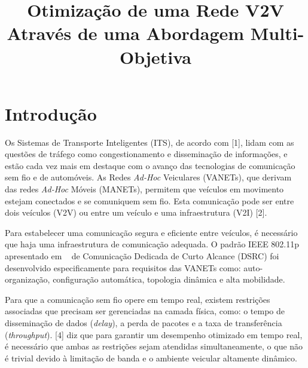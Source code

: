 \documentclass[conference]{IEEEtran}
\begin{document}
\title{Otimização de uma Rede V2V Através de uma Abordagem Multi-Objetiva}

\author{
\and
{}
}

\maketitle

\begin{abstract}
\end{abstract}

\section{Introdução}

Os Sistemas de Transporte Inteligentes (ITS), de acordo com [1], lidam com as questões de tráfego como congestionamento e disseminação de informações, e estão cada vez mais em destaque com o avanço das tecnologias de comunicação sem fio e de automóveis. As Redes \textit{Ad-Hoc} Veiculares (VANETs), que derivam das redes \textit{Ad-Hoc} Móveis (MANETs), permitem que veículos em movimento estejam conectados e se comuniquem sem fio. Esta comunicação pode ser entre dois veículos (V2V) ou entre um veículo e uma infraestrutura (V2I) [2].

Para estabelecer uma comunicação segura e eficiente entre veículos, é
necessário que haja uma infraestrutura de comunicação adequada. O
padrão IEEE 802.11p apresentado em ~\cite{jiang-delgrossi-2008}
 de Comunicação Dedicada de
Curto Alcance (DSRC) foi desenvolvido especificamente para requisitos
das VANETs como: auto-organização, configuração automática, topologia
dinâmica e alta mobilidade.

Para que a comunicação sem fio opere em tempo real, existem restrições associadas que precisam ser gerenciadas na camada física, como: o tempo de disseminação de dados (\textit{delay}), a perda de pacotes e a taxa de transferência (\textit{throughput}). [4] diz que para garantir um desempenho otimizado em tempo real, é necessário que ambas as restrições sejam atendidas simultaneamente, o que não é trivial devido à limitação de banda e o ambiente veicular altamente dinâmico.
\end{document}

